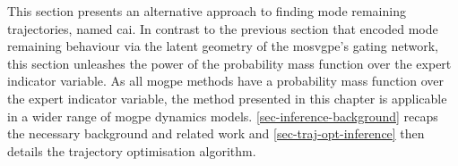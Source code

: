\documentclass{mimosis-class/mimosis}
\numberwithin{equation}{chapter}
\newcommand{\modeInd}{\ensuremath{k}}
\newcommand{\modeDesInd}{\ensuremath{\text{des}}}
\newcommand{\modeDes}[1]{\ensuremath{#1^{\modeDesInd}}}
\newcommand{\state}{\ensuremath{\mathbf{x}}}
\newcommand{\control}{\ensuremath{\mathbf{u}}}
\newcommand{\modeVar}{\ensuremath{\alpha}}
\begin{document}
{\renewcommand{\trajectoryVarDist}{\ensuremath{q(\stateTraj, \controlTraj \mid \state_0, \modeVarTraj)}}
\newcommand{\controlTrajVarDist}{\ensuremath{q(\control_{0:\TimeInd} \mid \state_{0:\TimeInd})}}
\newcommand{\controlVarDist}{\ensuremath{q(\control_{\timeInd})}}

\newcommand{\optimalVar}{\ensuremath{\mathcal{O}}}
\newcommand{\monotonicFunc}{\ensuremath{g}}
\newcommand{\temperature}{\ensuremath{\gamma}}

\newcommand{\optimalVarTraj}{\ensuremath{\bar{\bm{\optimalVar}}}}

\newcommand{\modeProb}{\ensuremath{\Pr(\modeVar_\timeInd = \modeInd \mid \state_\timeInd, \control_\timeInd)}}
\renewcommand{\optimalProb}{\ensuremath{\Pr(\optimalVar_\timeInd = 1 \mid \state_\timeInd, \control_\timeInd)}}
\newcommand{\optimalDist}{\ensuremath{P(\optimalVar_\timeInd \mid \state_\timeInd, \control_\timeInd)}}

\newcommand{\terminalCostDist}{\ensuremath{\Pr(\optimalVar_\TimeInd=1 \mid \state_\TimeInd)}}

\renewcommand{\marginalLikelihood}{\ensuremath{p(\optimalVarTraj, \modeVarTraj \mid \state_0)}}
\renewcommand{\jointDist}{\ensuremath{p(\optimalVarTraj, \stateTraj, \controlTraj \mid \state_0})}

\renewcommand{\trajectoryDist}{\ensuremath{p(\state_{1:\TimeInd}, \control_{0:\TimeInd} \mid \state_0)}}


\newcommand{\objective}{\ensuremath{J_{\text{quadratic}}}}

\renewcommand{\priorPolicy}{\ensuremath{\policy_0}}
\renewcommand{\priorPolicyDist}{\ensuremath{p_{\policy_0}}}
\renewcommand{\policyDist}{\ensuremath{p_{\policy}}}
This section presents an alternative approach to finding mode remaining trajectories, named
\acrfull{cai}.
In contrast to the previous section that
encoded mode remaining behaviour via the latent geometry of the \acrshort{mosvgpe}'s gating network,
this section unleashes the power of the probability mass function over the expert indicator variable.
As all \acrshort{mogpe} methods have a probability mass function over the expert indicator variable,
the method presented in this chapter is applicable in a wider range of \acrshort{mogpe} dynamics models.
\cref{sec-inference-background} recaps the necessary background and related work and
\cref{sec-traj-opt-inference} then details the trajectory optimisation algorithm.
}
\end{document}
